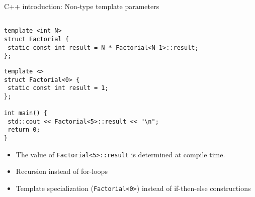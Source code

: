 \documentclass[9pt]{beamer}
\begin{document}
\begin{frame}[fragile]{C++ introduction: Non-type template parameters}
\begin{lstlisting}

template <int N>
struct Factorial {
 static const int result = N * Factorial<N-1>::result;
};
\end{lstlisting}
\pause
\begin{lstlisting}
template <>
struct Factorial<0> {
 static const int result = 1;
};

int main() {
 std::cout << Factorial<5>::result << "\n";
 return 0;
}
\end{lstlisting}

\begin{itemize}
   \item The value of \lstinline|Factorial<5>::result| is determined at compile time.
   \item Recursion instead of for-loops
   \item Template specialization (\lstinline|Factorial<0>|) instead of if-then-else constructions
\end{itemize}


\end{frame}
\end{document}
